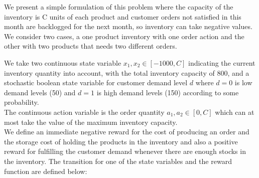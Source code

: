 \documentclass[letterpaper]{article}
\begin{document}
We present a simple formulation of this problem where the capacity of the inventory is C units of each product and customer orders not satisfied in this month are backlogged for the next month, so inventory can take negative values. We consider two cases, a one product inventory with one order action and the other with two products that needs two different orders.

We take two continuous state variable $x_1,x_2 \in [-1000,C]$ indicating the current inventory quantity into account, with the total inventory capacity of 800, and a stochastic boolean state variable for customer demand level $d$ where $d=0$ is low demand levels (50) and $d=1$ is high demand levels (150) according to some probability. \\
The continuous action variable is the order quantity $a_1,a_2 \in [0,C]$ which can at most take the value of the maximum inventory capacity. \\

We define an immediate negative reward for the cost of producing an order and the storage cost of holding the products in the inventory and also a positive reward for fulfilling the customer demand whenever there are enough stocks in the inventory. The transition for one of the state variables and the reward function are defined below:
\end{document}
